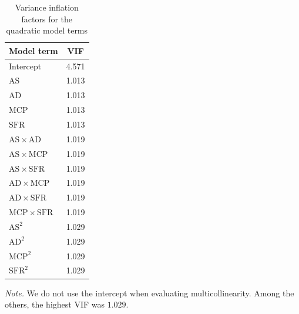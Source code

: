 \documentclass[12pt]{article}
\begin{document}
\begin{table}[htbp]
    \centering
    \caption{Variance inflation factors for the quadratic model terms}
    \label{tab:vif}
    \begin{threeparttable}
        \begin{tabular}{lc}
            \toprule
            Model term & VIF \\
            \midrule
            Intercept                & 4.571 \\
            $\mathrm{AS}$            & 1.013 \\
            $\mathrm{AD}$            & 1.013 \\
            $\mathrm{MCP}$           & 1.013 \\
            $\mathrm{SFR}$           & 1.013 \\
            $\mathrm{AS}\times\mathrm{AD}$   & 1.019 \\
            $\mathrm{AS}\times\mathrm{MCP}$  & 1.019 \\
            $\mathrm{AS}\times\mathrm{SFR}$  & 1.019 \\
            $\mathrm{AD}\times\mathrm{MCP}$  & 1.019 \\
            $\mathrm{AD}\times\mathrm{SFR}$  & 1.019 \\
            $\mathrm{MCP}\times\mathrm{SFR}$ & 1.019 \\
            $\mathrm{AS}^{2}$        & 1.029 \\
            $\mathrm{AD}^{2}$        & 1.029 \\
            $\mathrm{MCP}^{2}$       & 1.029 \\
            $\mathrm{SFR}^{2}$       & 1.029 \\
            \bottomrule
        \end{tabular}
        \begin{tablenotes}[flushleft]
            \footnotesize
            \item \textit{Note.} We do not use the intercept when evaluating multicollinearity. Among the others, the highest VIF was $1.029$.
        \end{tablenotes}
    \end{threeparttable}
\end{table}
\end{document}

